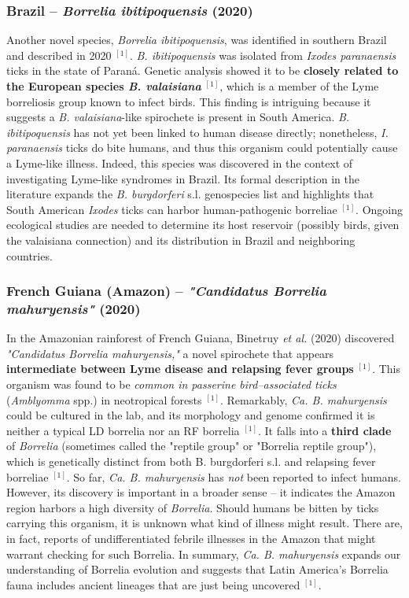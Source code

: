 \documentclass[11pt,letterpaper]{article}
\newcommand{\mycite}[1]{$^{[#1]}$}
\begin{document}
\subsubsection{Brazil – \textit{Borrelia ibitipoquensis} (2020)}
Another novel species, \textit{Borrelia ibitipoquensis}, was identified in southern Brazil and described in 2020 \mycite{1}. \textit{B. ibitipoquensis} was isolated from \textit{Ixodes paranaensis} ticks in the state of Paraná. Genetic analysis showed it to be \textbf{closely related to the European species \textit{B. valaisiana}} \mycite{1}, which is a member of the Lyme borreliosis group known to infect birds. This finding is intriguing because it suggests a \textit{B. valaisiana}-like spirochete is present in South America. \textit{B. ibitipoquensis} has not yet been linked to human disease directly; nonetheless, \textit{I. paranaensis} ticks do bite humans, and thus this organism could potentially cause a Lyme-like illness. Indeed, this species was discovered in the context of investigating Lyme-like syndromes in Brazil. Its formal description in the literature expands the \textit{B. burgdorferi} s.l. genospecies list and highlights that South American \textit{Ixodes} ticks can harbor human-pathogenic borreliae \mycite{1}. Ongoing ecological studies are needed to determine its host reservoir (possibly birds, given the valaisiana connection) and its distribution in Brazil and neighboring countries.

\subsubsection{French Guiana (Amazon) – \textit{"Candidatus Borrelia mahuryensis"} (2020)}
In the Amazonian rainforest of French Guiana, Binetruy \textit{et al.} (2020) discovered \textit{"Candidatus Borrelia mahuryensis,"} a novel spirochete that appears \textbf{intermediate between Lyme disease and relapsing fever groups} \mycite{1}. This organism was found to be \textit{common in passerine bird–associated ticks} (\textit{Amblyomma} spp.) in neotropical forests \mycite{1}. Remarkably, \textit{Ca. B. mahuryensis} could be cultured in the lab, and its morphology and genome confirmed it is neither a typical LD borrelia nor an RF borrelia \mycite{1}. It falls into a \textbf{third clade} of \textit{Borrelia} (sometimes called the "reptile group" or "Borrelia reptile group"), which is genetically distinct from both B. burgdorferi s.l. and relapsing fever borreliae \mycite{1}. So far, \textit{Ca. B. mahuryensis} has \textit{not} been reported to infect humans. However, its discovery is important in a broader sense – it indicates the Amazon region harbors a high diversity of \textit{Borrelia}. Should humans be bitten by ticks carrying this organism, it is unknown what kind of illness might result. There are, in fact, reports of undifferentiated febrile illnesses in the Amazon that might warrant checking for such Borrelia. In summary, \textit{Ca. B. mahuryensis} expands our understanding of Borrelia evolution and suggests that Latin America's Borrelia fauna includes ancient lineages that are just being uncovered \mycite{1}.
\end{document}
